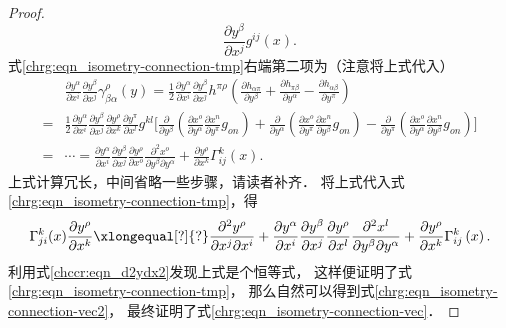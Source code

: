 \begin{proof}
\begin{equation}
        \frac{\partial y^\beta}{\partial x^j} g^{ij}(x) .
    \end{equation}
    式\eqref{chrg:eqn_isometry-connection-tmp}右端第二项为（注意将上式代入）
    \begin{align*}
      &\frac{\partial y^\alpha}{\partial x^i}
      \frac{\partial y^\beta}{\partial x^j}
      \gamma^{\rho}_{\beta\alpha}(y)
      = \frac{1}{2}\frac{{\partial {y^\alpha }}}{{\partial {x^i}}}\frac{{\partial {y^\beta }}}{{\partial {x^j}}}
      {{h}^{\pi \rho }}\left( \frac{\partial h_{\alpha \pi   }} {\partial y^\beta}
           +\frac{\partial h_{\pi \beta   }} {\partial y^\alpha }
           -\frac{\partial h_{\alpha \beta}} {\partial y^\pi } \right)\\
      =& \frac{1}{2}\frac{{\partial {y^\alpha }}}{{\partial {x^i}}}\frac{{\partial {y^\beta }}}{{\partial {x^j}}}
      \frac{{\partial {y^\rho }}}{{\partial {x^k}}}\frac{{\partial {y^\pi }}}{{\partial {x^l}}}
      {g^{kl}} \biggl[ \frac{\partial }{{\partial {y^\beta }}}
      \left( {\frac{{\partial {x^o}}}{{\partial {y^\alpha }}}\frac{{\partial {x^n}}}{{\partial {y^\pi }}}{g_{on}}} \right)
       +\frac{\partial }{{\partial {y^\alpha }}}\left( {\frac{{\partial {x^o}}}{{\partial {y^\pi }}}
           \frac{{\partial {x^n}}}{{\partial {y^\beta }}}{g_{on}}} \right)
       - \frac{\partial }{{\partial {y^\pi }}}\left( {\frac{{\partial {x^o}}}{{\partial {y^\alpha }}}
           \frac{{\partial {x^n}}}{{\partial {y^\beta }}}{g_{on}}} \right)  \biggr] \\
      =& \cdots =
      \frac{{\partial {y^\alpha }}}{{\partial {x^i}}}\frac{{\partial {y^\beta }}}{{\partial {x^j}}}
      \frac{{\partial {y^\rho }}}{{\partial {x^o}}}\frac{{{\partial ^2}{x^o}}}{{\partial {y^\beta }\partial {y^\alpha }}}
       + \frac{{\partial {y^\rho }}}{{\partial {x^k}}}\Gamma _{ij}^k\left( x \right) .
    \end{align*}  %
    上式计算冗长，中间省略一些步骤，请读者补齐．
    将上式代入式\eqref{chrg:eqn_isometry-connection-tmp}，得
    \begin{equation}
        \Gamma^{k}_{ji}(x) \frac{\partial y^\rho}{\partial x^k} 
        \xlongequal[?]{?}
        \frac{\partial^2 y^\rho}{\partial x^j \partial x^i}+
        \frac{{\partial {y^\alpha }}}{{\partial {x^i}}}\frac{{\partial {y^\beta }}}{{\partial {x^j}}}
        \frac{{\partial {y^\rho }}}{{\partial {x^l}}}\frac{{{\partial ^2}{x^l}}}{{\partial {y^\beta }\partial {y^\alpha }}}
         + \frac{{\partial {y^\rho }}}{{\partial {x^k}}}\Gamma _{ij}^k\left( x \right) .
    \end{equation}
    利用式\eqref{chccr:eqn_d2ydx2}发现上式是个恒等式，
    这样便证明了式\eqref{chrg:eqn_isometry-connection-tmp}，
    那么自然可以得到式\eqref{chrg:eqn_isometry-connection-vec2}，
    最终证明了式\eqref{chrg:eqn_isometry-connection-vec}．
\end{proof}

